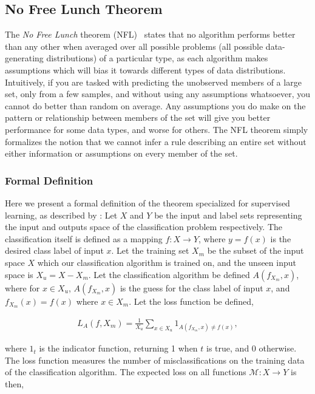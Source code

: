\documentclass[thesis]{subfiles}
\begin{document}
\subsection{No Free Lunch Theorem}
\label{nofreelunch}
The \emph{No Free Lunch} theorem (NFL)~\citep{wolpert1996lack} states that no algorithm performs better than any other when averaged over all possible problems (\ie all possible data-generating distributions) of a particular type, as each algorithm makes assumptions which will bias it towards different types of data distributions. Intuitively, if you are tasked with predicting the unobserved members of a large set, only from a few samples, and without using any assumptions whatsoever, you cannot do better than random on average. Any assumptions you do make on the pattern or relationship between members of the set will give you better performance for some data types, and worse for others. The NFL theorem simply formalizes the notion that we cannot infer a rule describing an entire set without either information or assumptions on every member of the set.

\subsubsection{Formal Definition}
Here we present a formal definition of the theorem specialized for supervised learning, as described by \citet{lattimore2013no}: Let $X$ and $Y$ be the input and label sets representing the input and outputs space of the classification problem respectively. The classification itself is defined as a mapping $f: X \to Y$, where $y=f(x)$ is the desired class label of input $x$. Let the training set $X_m$ be the subset of the input space $X$ which our classification algorithm is trained on, and the unseen input space is $X_u = X - X_m$. Let the classification algorithm be defined $A(f_{X_{m}}, x)$, where for $x \in X_u$, $A(f_{X_{m}}, x)$ is the guess for the class label of input $x$, and $f_{X_{m}}(x) = f(x)$ where $x\in X_m$. Let the loss function be defined,

\begin{align}
    L_A(f, X_m) = \frac{1}{X_u} \sum_{x\in X_u} 1_{A(f_{X_m}, x) \neq f(x)},
\end{align}

where $1_{t}$ is the indicator function, returning 1 when $t$ is true, and 0 otherwise. The loss function measures the number of misclassifications on the training data of the classification algorithm. The expected loss on all functions $\mathcal{M}: X \to Y$ is then,
\end{document}
